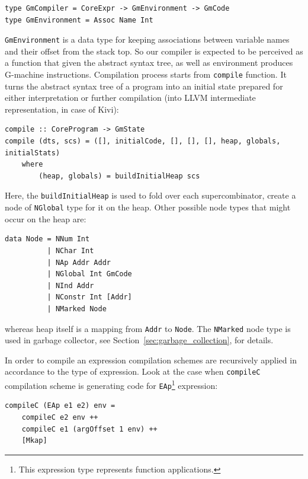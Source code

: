 \documentclass[12pt,a4paper]{report}
\begin{document}
\vspace*{0.2in}
\begin{lstlisting}[style=haskell]
type GmCompiler = CoreExpr -> GmEnvironment -> GmCode
type GmEnvironment = Assoc Name Int
\end{lstlisting}

\texttt{GmEnvironment} is a data type for keeping associations between variable
names and their offset from the stack top. So our compiler is expected to be
perceived as a function that given the abstract syntax tree, as well as
environment produces G-machine instructions. Compilation process starts from
\texttt{compile} function. It turns the abstract syntax tree of a program into
an initial state prepared for either interpretation or further compilation (into
LLVM intermediate representation, in case of Kivi):

\vspace*{0.2in}
\begin{lstlisting}[style=haskell]
compile :: CoreProgram -> GmState
compile (dts, scs) = ([], initialCode, [], [], [], heap, globals, initialStats)
    where
        (heap, globals) = buildInitialHeap scs
\end{lstlisting}

Here, the \texttt{buildInitialHeap} is used to fold over each supercombinator,
create a node of \texttt{NGlobal} type for it on the heap. Other possible node
types that might occur on the heap are:

\vspace*{0.2in}
\begin{lstlisting}[style=haskell]
data Node = NNum Int
          | NChar Int
          | NAp Addr Addr
          | NGlobal Int GmCode
          | NInd Addr
          | NConstr Int [Addr]
          | NMarked Node
\end{lstlisting}

whereas heap itself is a mapping from \texttt{Addr} to \texttt{Node}. The
\texttt{NMarked} node type is used in garbage collector, see
Section~\ref{sec:garbage_collection}, for details.

In order to compile an expression compilation schemes are recursively applied
in accordance to the type of expression. Look at the case when
\texttt{compileC} compilation scheme is generating code for
\texttt{EAp}\footnote{This expression type represents function applications.}
expression:

\vspace*{0.2in}
\begin{lstlisting}[style=haskell]
compileC (EAp e1 e2) env =
    compileC e2 env ++
    compileC e1 (argOffset 1 env) ++
    [Mkap]
\end{lstlisting}
\end{document}
